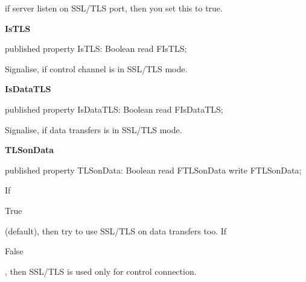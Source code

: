 \documentclass{report}
\newif\ifpdf
\begin{document}
\begin{list}{}
\begin{flushleft}
\ifpdf
\end{flushleft}
\fi


\par if server listen on SSL/TLS port, then you set this to true.\label{ftpsend.TFTPSend-IsTLS}
\item[\textbf{IsTLS}\hfill]
\ifpdf
\begin{flushleft}
\fi
\begin{ttfamily}
published property IsTLS: Boolean read FIsTLS;\end{ttfamily}

\ifpdf
\end{flushleft}
\fi


\par Signalise, if control channel is in SSL/TLS mode.\label{ftpsend.TFTPSend-IsDataTLS}
\item[\textbf{IsDataTLS}\hfill]
\ifpdf
\begin{flushleft}
\fi
\begin{ttfamily}
published property IsDataTLS: Boolean read FIsDataTLS;\end{ttfamily}

\ifpdf
\end{flushleft}
\fi


\par Signalise, if data transfers is in SSL/TLS mode.\label{ftpsend.TFTPSend-TLSonData}
\item[\textbf{TLSonData}\hfill]
\ifpdf
\begin{flushleft}
\fi
\begin{ttfamily}
published property TLSonData: Boolean read FTLSonData write FTLSonData;\end{ttfamily}

\ifpdf
\end{flushleft}
\fi


\par If \begin{ttfamily}True\end{ttfamily} (default), then try to use SSL/TLS on data transfers too. If \begin{ttfamily}False\end{ttfamily}, then SSL/TLS is used only for control connection.\end{list}
\end{document}
